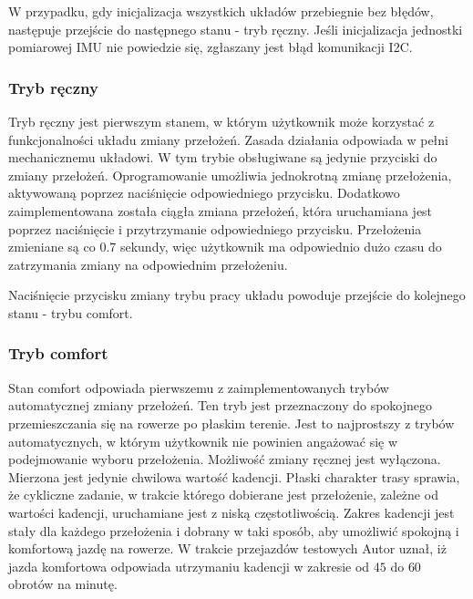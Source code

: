 W przypadku, gdy inicjalizacja wszystkich układów przebiegnie bez błędów, następuje przejście do następnego stanu - tryb ręczny. Jeśli inicjalizacja jednostki pomiarowej IMU nie powiedzie się, zgłaszany jest błąd komunikacji I2C. 
\subsubsection{Tryb ręczny}
Tryb ręczny jest pierwszym stanem, w którym użytkownik może korzystać z funkcjonalności układu zmiany przełożeń. Zasada działania odpowiada w pełni mechanicznemu układowi. W tym trybie obsługiwane są jedynie przyciski do zmiany przełożeń. Oprogramowanie umożliwia jednokrotną zmianę przełożenia, aktywowaną poprzez naciśnięcie odpowiedniego przycisku. Dodatkowo zaimplementowana została ciągła zmiana przełożeń, która uruchamiana jest poprzez naciśnięcie i przytrzymanie odpowiedniego przycisku. Przełożenia zmieniane są co 0.7 sekundy, więc użytkownik ma odpowiednio dużo czasu do zatrzymania zmiany na odpowiednim przełożeniu.

Naciśnięcie przycisku zmiany trybu pracy układu powoduje przejście do kolejnego stanu - trybu comfort.
\subsubsection{Tryb comfort}
Stan comfort odpowiada pierwszemu z zaimplementowanych trybów automatycznej zmiany przełożeń. Ten tryb jest przeznaczony do spokojnego przemieszczania się na rowerze po płaskim terenie. Jest to najprostszy z trybów automatycznych, w którym użytkownik nie powinien angażować się w podejmowanie wyboru przełożenia. Możliwość zmiany ręcznej jest wyłączona. Mierzona jest jedynie chwilowa wartość kadencji. Płaski charakter trasy sprawia, że cykliczne zadanie, w trakcie którego dobierane jest przełożenie, zależne od wartości kadencji, uruchamiane jest z niską częstotliwością. Zakres kadencji jest stały dla każdego przełożenia i dobrany w taki sposób, aby umożliwić spokojną i komfortową jazdę na rowerze. W trakcie przejazdów testowych Autor uznał, iż jazda komfortowa odpowiada utrzymaniu kadencji w zakresie od $45$ do $60$ obrotów na minutę.
